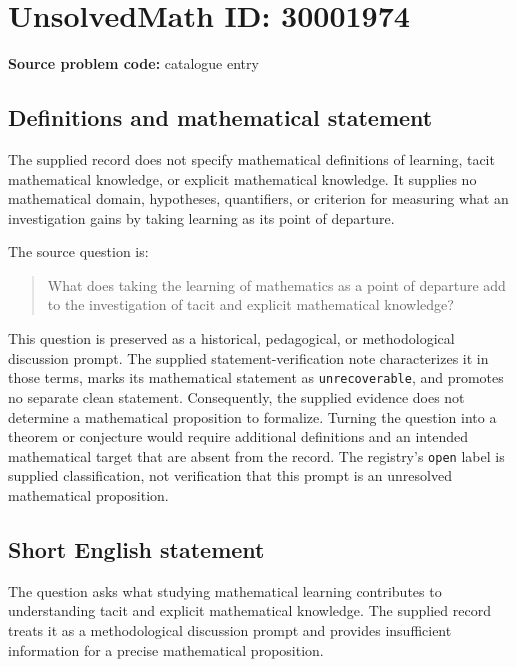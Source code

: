 \documentclass[11pt]{article}
\begin{document}
\section*{UnsolvedMath ID: 30001974}
\textbf{Source problem code:} catalogue entry
\subsection{Definitions and mathematical statement}
The supplied record does not specify mathematical definitions of learning, tacit mathematical knowledge, or explicit mathematical knowledge. It supplies no mathematical domain, hypotheses, quantifiers, or criterion for measuring what an investigation gains by taking learning as its point of departure.

The source question is:
\begin{quote}
What does taking the learning of mathematics as a point of departure add to the investigation of tacit and explicit mathematical knowledge?
\end{quote}

This question is preserved as a historical, pedagogical, or methodological discussion prompt. The supplied statement-verification note characterizes it in those terms, marks its mathematical statement as \texttt{unrecoverable}, and promotes no separate clean statement. Consequently, the supplied evidence does not determine a mathematical proposition to formalize. Turning the question into a theorem or conjecture would require additional definitions and an intended mathematical target that are absent from the record. The registry's \texttt{open} label is supplied classification, not verification that this prompt is an unresolved mathematical proposition.
\subsection{Short English statement}
The question asks what studying mathematical learning contributes to understanding tacit and explicit mathematical knowledge. The supplied record treats it as a methodological discussion prompt and provides insufficient information for a precise mathematical proposition.
\end{document}

